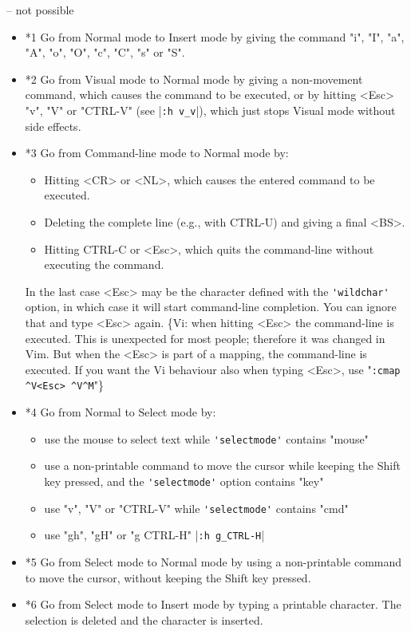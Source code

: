 -- not possible

\begin{itemize}
				\item *1 Go from Normal mode to Insert mode by giving the command "i", "I", "a", "A", "o", "O", "c", "C", "s" or "S".
				\item *2 Go from Visual mode to Normal mode by giving a non-movement command, which causes the command to be executed, or by hitting <Esc> "v", "V" or "CTRL-V" (see |\verb!:h v_v!|), which just stops Visual mode without side effects.
				\item *3 Go from Command-line mode to Normal mode by:
								\begin{itemize}
												\item Hitting <CR> or <NL>, which causes the entered command to be executed.
												\item Deleting the complete line (e.g., with CTRL-U) and giving a final <BS>.
												\item Hitting CTRL-C or <Esc>, which quits the command-line without executing
																the command.
								\end{itemize}
								In the last case <Esc> may be the character defined with the \verb!'wildchar'! option, in which case it will start command-line completion.
								You can ignore that and type <Esc> again.
								\{Vi: when hitting <Esc> the command-line is executed.
								This is unexpected for most people; therefore it was changed in Vim.
								But when the <Esc> is part of a mapping, the command-line is executed.
								If you want the Vi behaviour also when typing <Esc>, use "\verb!:cmap ^V<Esc> ^V^M!"\}
				\item *4 Go from Normal to Select mode by:
								\begin{itemize}
												\item use the mouse to select text while \verb!'selectmode'! contains "mouse"
												\item use a non-printable command to move the cursor while keeping the Shift key pressed, and the \verb!'selectmode'! option contains "key"
												\item use "v", "V" or "CTRL-V" while \verb!'selectmode'! contains "cmd"
												\item use "gh", "gH" or "g CTRL-H"  |\verb!:h g_CTRL-H!|
								\end{itemize}
				\item *5 Go from Select mode to Normal mode by using a non-printable command to move the cursor, without keeping the Shift key pressed.
				\item *6 Go from Select mode to Insert mode by typing a printable character.
								The selection is deleted and the character is inserted.
\end{itemize}

